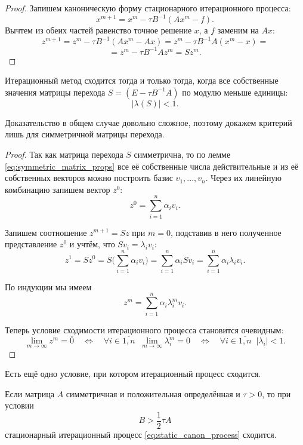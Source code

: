 \documentclass{article}
\begin{document}
\begin{proof}
	Запишем каноническую форму стационарного итерационного процесса:
	\[x^{m+1}=x^m-\tau B^{-1}(Ax^m-f).\]
	Вычтем из обеих частей равенство точное решение $x$, а $f$ заменим на
	$Ax$:
	\[z^{m+1}=z^m-\tau B^{-1}(Ax^m-Ax)=z^m-\tau B^{-1}A(x^m-x)=\]
	\[=z^m-\tau B^{-1}Az^m=Sz^m.\]
\end{proof}

\begin{theorem}
\label{eq:sle_convergence_criterion}
	Итерационный метод сходится тогда и только тогда, когда все собственные
	значения матрицы перехода $S=(E-\tau B^{-1}A)$ по модулю меньше единицы:
	\[|\lambda (S)|<1.\]
\end{theorem}

Доказательство в общем случае довольно сложное, поэтому докажем критерий лишь
для симметричной матрицы перехода.

\begin{proof}
	Так как матрица перехода $S$ симметрична, то по лемме
	\eqref{eq:symmetric_matrix_props} все её собственные числа
	действительные и из её собственных векторов можно построить базис
	$v_1,...,v_n$. Через их линейную комбинацию запишем вектор $z^0$:
	\[z^0=\sum_{i=1}^{n}\alpha_iv_i.\]

	Запишем соотношение $z^{m+1}=Sz$ при $m=0$, подставив в него полученное
	представление $z^0$ и учтём, что $Sv_i=\lambda_iv_i$:
	\[z^1=Sz^0=S\Big(\sum_{i=1}^{n}\alpha_iv_i\Big)=
	\sum_{i=1}^{n}\alpha_iSv_i=
	\sum_{i=1}^{n}\alpha_i\lambda_iv_i.\]

	По индукции мы имеем
	\[z^m=\sum_{i=1}^{n}\alpha_i\lambda_i^mv_i.\]

	Теперь условие сходимости итерационного процесса становится очевидным:
	\[\lim_{m\to\infty}z^m=\overline{0}\quad\Leftrightarrow\quad
	\forall i\in\overline{1,n}\;\;\lim_{m\to\infty}\lambda_i^m=0\quad
	\Leftrightarrow\quad \forall i\in\overline{1,n}\;\;|\lambda_i|<1.\]
\end{proof}

Есть ещё одно условие, при котором итерационный процесс сходится.

\begin{theorem}[Самарского]
\label{eq:samarskiy_criterion}
	Если матрица $A$ симметричная и положительная определённая и $\tau>0$,
	то при условии
	\[B>\frac{1}{2}\tau A\]
	стационарный итерационный процесс \eqref{eq:static_canon_process}
	сходится.
\end{theorem}
\end{document}
